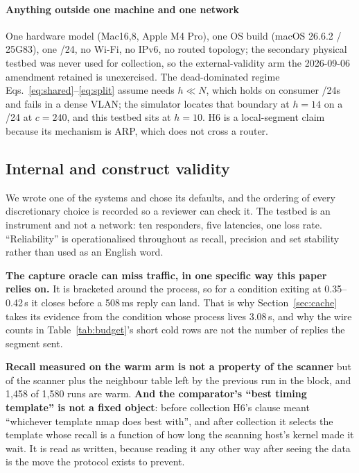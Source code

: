 \documentclass[conference]{IEEEtran}
\begin{document}
\paragraph*{Anything outside one machine and one network} One hardware model
(Mac16,8, Apple M4 Pro), one OS build (macOS 26.6.2 / 25G83), one /24, no
Wi-Fi, no IPv6, no routed topology; the secondary physical testbed was never
used for collection, so the external-validity arm the 2026-09-06 amendment
retained is unexercised. The dead-dominated regime
Eqs.~\ref{eq:shared}--\ref{eq:split} assume needs $h\ll N$, which holds on
consumer /24s and fails in a dense VLAN; the simulator locates that boundary at
$h=14$ on a /24 at $c=240$, and this testbed sits at $h=10$. H6 is a
local-segment claim because its mechanism is ARP, which does not cross a
router.

\subsection{Internal and construct validity}

We wrote one of the systems and chose its defaults, and the ordering of every
discretionary choice is recorded so a reviewer can check it. The testbed is an
instrument and not a network: ten responders, five latencies, one loss rate.
``Reliability'' is operationalised throughout as recall, precision and set
stability rather than used as an English word.

\textbf{The capture oracle can miss traffic, in one specific way this paper
relies on.} It is bracketed around the process, so for a condition exiting at
0.35--0.42\,s it closes before a 508\,ms reply can land. That is why
Section~\ref{sec:cache} takes its evidence from the condition whose process
lives 3.08\,s, and why the wire counts in Table~\ref{tab:budget}'s short cold
rows are not the number of replies the segment sent.

\textbf{Recall measured on the warm arm is not a property of the scanner} but
of the scanner plus the neighbour table left by the previous run in the block,
and 1{,}458 of 1{,}580 runs are warm. \textbf{And the comparator's ``best
timing template'' is not a fixed object}: before collection H6's clause meant
``whichever template nmap does best with'', and after collection it selects the
template whose recall is a function of how long the scanning host's kernel made
it wait. It is read as written, because reading it any other way after seeing
the data is the move the protocol exists to prevent.
\end{document}
